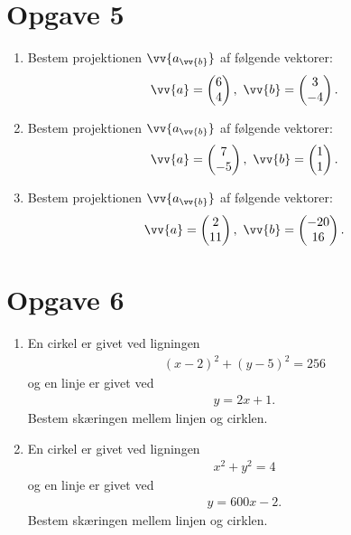 \section*{Opgave 5}
\begin{enumerate}[label=\roman*)]
	\item Bestem projektionen $\vv{a_{\vv{b}}}$ af følgende vektorer:
	\begin{align*}
		\vv{a} = 
		\begin{pmatrix}
			6  \\ 4
		\end{pmatrix},
		\ \vv{b} =
		\begin{pmatrix}
			3 \\ -4
		\end{pmatrix}.
	\end{align*}	
	\item Bestem projektionen $\vv{a_{\vv{b}}}$ af følgende vektorer:
	\begin{align*}
		\vv{a} = 
		\begin{pmatrix}
			7  \\ -5
		\end{pmatrix},
		\ \vv{b} =
		\begin{pmatrix}
			1 \\ 1
		\end{pmatrix}.
	\end{align*}	
	\item Bestem projektionen $\vv{a_{\vv{b}}}$ af følgende vektorer:
	\begin{align*}
		\vv{a} = 
		\begin{pmatrix}
			2  \\ 11
		\end{pmatrix},
		\ \vv{b} =
		\begin{pmatrix}
			-20 \\ 16
		\end{pmatrix}.
	\end{align*}	
\end{enumerate}
\section*{Opgave 6}
\begin{enumerate}[label=\roman*)]
	\item En cirkel er givet ved ligningen
	\begin{align*}
		(x-2)^2+(y-5)^2 = 256
	\end{align*}
	og en linje er givet ved
	\begin{align*}
		y=2x+1.
	\end{align*}
	Bestem skæringen mellem linjen og cirklen.
	\item En cirkel er givet ved ligningen
	\begin{align*}
		x^2+y^2 = 4
	\end{align*}
	og en linje er givet ved
	\begin{align*}
		y=600x-2.
	\end{align*}
	Bestem skæringen mellem linjen og cirklen.
\end{enumerate}
